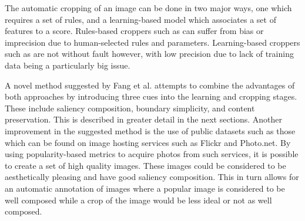 The automatic cropping of an image can be done in two major ways, one which
requires a set of rules, and a learning-based model which associates a set of
features to a score.
Rules-based croppers such as \cite{liu2010optimizing, zhang2005auto} can suffer
from bias or imprecision due to human-selected rules and parameters.
Learning-based croppers such as \cite{park2012modeling, yan2013learning} are
not without fault however, with low precision due to lack of training data being
a particularly big issue.

A novel method suggested by Fang et al. \cite{fang2014automatic} attempts to
combine the advantages of both approaches by introducing three cues into the
learning and cropping stages.
These include saliency composition, boundary simplicity, and content
preservation.
This is described in greater detail in the next sections.
Another improvement in the suggested method is the use of public datasets such
as those which can be found on image hosting services such as Flickr and
Photo.net.
By using popularity-based metrics to acquire photos from such services, it is possible to create a set of high quality images.
These images could be considered to be aesthetically pleasing and have good saliency composition.
This in turn allows for an automatic annotation of images where a popular image is considered to be well composed while a crop of the image would be less ideal or not as well composed.

